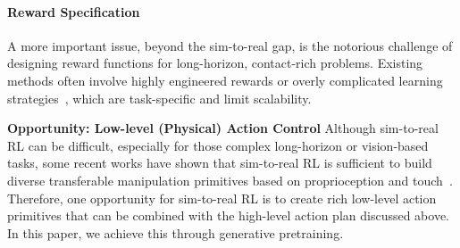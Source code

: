 \paragraph{Reward Specification} A more important issue, beyond the sim-to-real gap, is the notorious challenge of designing reward functions for long-horizon, contact-rich problems. Existing methods often involve highly engineered rewards or overly complicated learning strategies~\cite{chen2023sequential}, which are task-specific and limit scalability.

\textbf{Opportunity: Low-level (Physical) Action Control} Although sim-to-real RL can be difficult, especially for those complex long-horizon or vision-based tasks, some recent works have shown that sim-to-real RL is sufficient to build diverse transferable manipulation primitives based on proprioception and touch~\cite{yin2023rotating}. Therefore, one opportunity for sim-to-real RL is to create rich low-level action primitives that can be combined with the high-level action plan discussed above. In this paper, we achieve this through generative pretraining.
